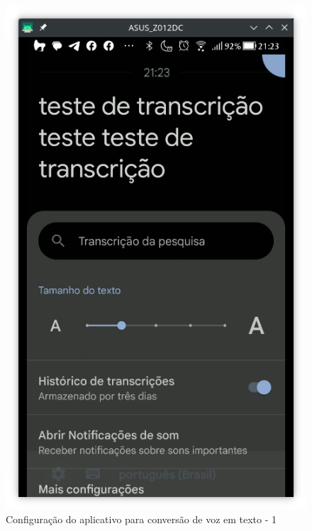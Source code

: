 \documentclass[
  12pt,       %
  openright,      %
  twoside,      %
  a4paper,      %
  english,      %
  french,       %
  spanish,      %
  brazil        %
  ]{abntex2}
\begin{document}
\begin{figure}[!htb]
\begin{minipage}{0.29\textwidth}
    \includegraphics[width=\linewidth]{android_4.png}
    \caption{Configuração do aplicativo para conversão de voz em texto - 1}
    \label{fig:imagem4}
  \end{minipage}\hfill
  \begin{minipage}{0.29\textwidth}
    \centering

\end{minipage}
\end{figure}
\end{document}
